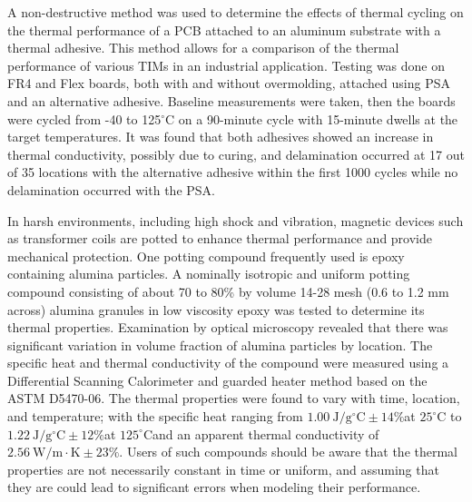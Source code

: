 A non-destructive method was used to determine the effects of thermal cycling on the thermal performance of a PCB attached to an aluminum substrate with a thermal adhesive.  This method allows for a comparison of the thermal performance of various TIMs in an industrial application.  \newline
\indent Testing was done on FR4 and Flex boards, both with and without overmolding, attached using PSA and an alternative adhesive.  Baseline measurements were taken, then the boards were cycled from -40 to 125$^{\circ}$C on a 90-minute cycle with 15-minute dwells at the target temperatures. It was found that both adhesives showed an increase in thermal conductivity, possibly due to curing, and delamination occurred at 17 out of 35 locations with the alternative adhesive within the first 1000 cycles while no delamination occurred with the PSA. 

In harsh environments, including high shock and vibration, magnetic devices such as transformer coils are potted to enhance thermal performance and provide mechanical protection.  One potting compound frequently used is epoxy containing alumina particles. A nominally isotropic and uniform potting compound consisting of about 70 to 80\% by volume 14-28 mesh (0.6 to 1.2 mm across) alumina granules in low viscosity epoxy was tested to determine its thermal properties.  Examination by optical microscopy revealed that there was significant variation in volume fraction of alumina particles by location.  The specific heat and thermal conductivity of the compound were measured using a Differential Scanning Calorimeter and guarded heater method based on the ASTM D5470-06.  The thermal properties were found to vary with time, location, and temperature; with the specific heat ranging from \(1.00\:\mathrm{J/g^{\circ}\mathrm{C}}\pm 14\%\)at \(25^{\circ}\mathrm{C}\) to \(1.22\:\mathrm{J/g^{\circ}\mathrm{C}}\pm12\%\)at \(125^{\circ}\mathrm{C}\)and an apparent thermal conductivity of\(2.56\:\mathrm{W/m\cdot K}\pm 23\%\).  Users of such compounds should be aware that the thermal properties are not necessarily constant in time or uniform, and assuming that they are could lead to significant errors when modeling their performance.

